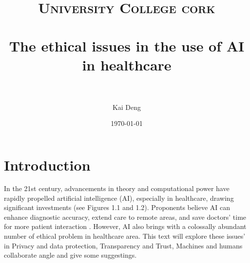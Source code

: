 \documentclass[paper=a4, fontsize=11pt]{scrartcl} %
\title{	
\normalfont \normalsize 
\textsc{University College cork} \\ [25pt] %
\horrule{0.5pt} \\[0.4cm] %
\huge The ethical issues in the use of AI in healthcare \\ %
\horrule{2pt} \\[0.5cm] %
}
\author{Kai Deng} %
\date{\normalsize\today} %
\numberwithin{equation}{section} %
\numberwithin{figure}{section} %
\numberwithin{table}{section} %
\begin{document}
\maketitle %


\section{Introduction}

In the 21st century, advancements in theory and computational power have rapidly propelled 
artificial intelligence (AI), especially in healthcare, drawing significant investments (see Figures 1.1 and 1.2). 
Proponents believe AI can enhance diagnostic accuracy, extend care to remote areas, and save doctors' 
time for more patient interaction \cite{frostPublicViewsEthical2022}. However, AI also brings with a 
colossally abundant number of ethical problem in healthcare area. This text will explore these issues' 
in Privacy and data protection, Transparency and Trust, Machines and humans collaborate angle and give some suggestings.
\end{document}
